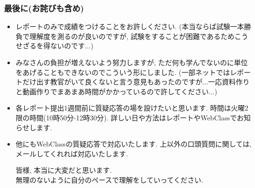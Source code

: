 \documentclass[11pt,dvipdfmx]{beamer}
\theoremstyle{definition}
\theoremstyle{remark}
\begin{document}
\begin{frame}
\frametitle{最後に(お詫びも含め)}
 \begin{itemize}
 \item レポートのみで成績をつけることをお許しください.
 {\tiny (本当ならば試験一本勝負で理解度を測るのが良いのですが, 試験をすることが困難であるためこうせざるを得ないのです...)}
 \item みなさんの負担が増えないよう努力しますが, ただ何も学んでないのに単位をあげることもできないのでこういう形にしました.
  {\tiny (一部ネットではレポートだけ出す教官がいて良くないと言う意見もあったのですが...一応資料作りと動画作りでまあまあ時間がかかっているので許してください...)}
 
 \item  各レポート提出1週間前に質疑応答の場を設けたいと思います. 時間は火曜2限の時間(10時50分-12時30分). 詳しい日や方法はレポートやWebClassでお知らせします.
 
\item 他にもWebClassの質疑応答で対応いたします. 上以外の口頭質問に関しては, メールしてくれれば対応いたします.

  \begin{alertblock}{}
  \begin{center}
皆様, 本当に大変だと思います. \\
無理のないように自分のペースで理解をしていってください.
  \end{center}
 \end{alertblock}


 \end{itemize}

\end{frame}
\end{document}
